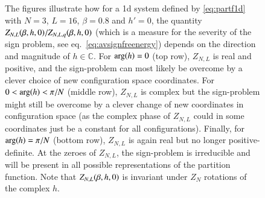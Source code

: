 \documentclass[epj]{webofc}
\let\originalleft\left
\let\originalright\right
\renewcommand{\left}{\mathopen{}\mathclose\bgroup\originalleft}
\renewcommand{\right}{\aftergroup\egroup\originalright}
\newcommand{\of}[1]{\left(#1\right)}
\renewcommand*\[{\begin{equation}}
\renewcommand*\]{\end{equation}}
\newlength{\hatchspread}
\newlength{\hatchthickness}
\newlength{\hatchshift}
\begin{document}
\begin{figure}[!h]
\begin{minipage}[b]{0.49\linewidth}
\end{minipage}\hfill
\begin{minipage}[b]{0.45\linewidth}
\centering
{}
\end{minipage}
\caption{The figures illustrate how for a 1d system defined by \eqref{eq:partf1d} with $N=3$, $L=16$, $\beta=0.8$ and $h'=0$, the quantity $Z_{N,L}\of{\beta,h,0}/Z_{N,L,q}\of{\beta,h,0}$ (which is a measure for the severity of the sign problem, see eq.~\eqref{eq:avsignfreenergy}) depends on the direction and magnitude of $h\in\mathbb{C}$. For $\arg\of{h}=0$ (top row), $Z_{N,L}$ is real and positive, and the sign-problem can most likely be overcome by a clever choice of new configuration space coordinates. For $0<\arg\of{h}<\pi/N$ (middle row), $Z_{N,L}$ is complex but the sign-problem might still be overcome by a clever change of new coordinates in configuration space (as the complex phase of $Z_{N,L}$ could in some coordinates just be a constant for all configurations). Finally, for $\arg\of{h}=\pi/N$ (bottom row), $Z_{N,L}$ is again real but no longer positive-definite. At the zeroes of $Z_{N,L}$, the sign-problem is irreducible and will be present in all possible representations of the partition function. Note that $Z_{N,L}\of{\beta,h,0}$ is invariant under $Z_{N}$ rotations of the complex $h$.}
\label{fig:signproblemvsh1d}
\end{figure}
\end{document}

